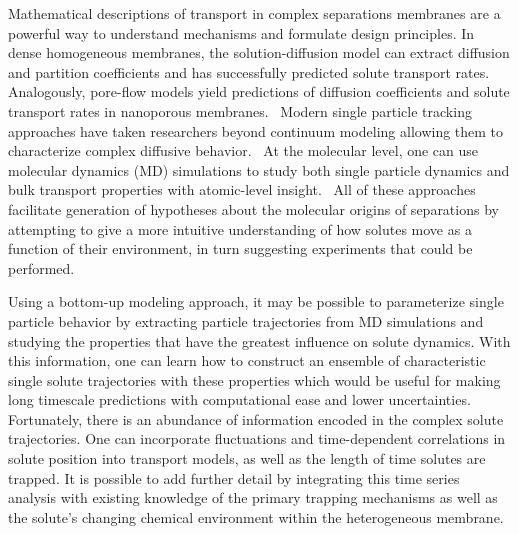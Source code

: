 \documentclass[journal=ancac3,manuscript=article,layout=twocolumn]{achemso}
\begin{document}
  Mathematical descriptions of transport in complex separations membranes are a
  powerful way to understand mechanisms and formulate design principles.
  \cite{vinh-thang_predictive_2013,geens_transport_2006,darvishmanesh_mass_2016}
  In dense homogeneous membranes, the solution-diffusion model
  can extract diffusion and partition coefficients and has successfully
  predicted solute transport rates.~\cite{wijmans_solution-diffusion_1995}
  Analogously, pore-flow models yield predictions of diffusion coefficients and
  solute transport rates in nanoporous membranes.~\cite{paul_diffusive_1974}
  Modern single particle tracking approaches have taken researchers beyond
  continuum modeling allowing them to characterize complex diffusive
  behavior.~\cite{manzo_review_2015} At the molecular level, one can use
  molecular dynamics (MD) simulations to study both single particle dynamics
  and bulk transport properties with atomic-level
  insight.~\cite{coscia_chemically_2019,maginn_best_2018} All of these
  approaches facilitate generation of hypotheses about the molecular origins of
  separations by attempting to give a more intuitive understanding of how
  solutes move as a function of their environment, in turn suggesting
  experiments that could be performed.


  Using a bottom-up modeling approach, it may be possible to parameterize single
  particle behavior by extracting particle trajectories from MD simulations and
  studying the properties that have the greatest influence on solute dynamics.
  With this information, one can learn how to construct an ensemble of characteristic
  single solute trajectories with these properties which would be useful for
  making long timescale predictions with computational ease and lower
  uncertainties. Fortunately, there is an abundance of information encoded in
  the complex solute trajectories. One can incorporate fluctuations and 
  time-dependent correlations in solute position into transport models, 
  as well as the length of time solutes are trapped. It is possible to add further
  detail by integrating this time series analysis with existing knowledge of the
  primary trapping mechanisms as well as the solute's changing chemical environment
  within the heterogeneous membrane. 
\end{document}
